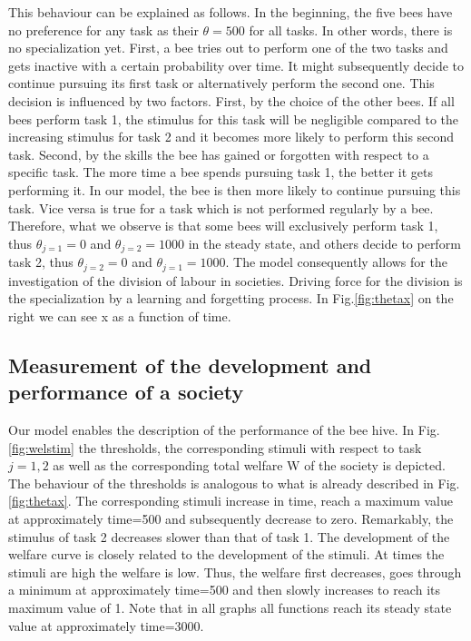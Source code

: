 This behaviour can be explained as follows. In the beginning, the five bees have no preference for any task as their $\theta=500$ for all tasks. In other words, there is no specialization yet. First, a bee tries out to perform one of the two tasks and gets inactive with a certain probability over time. It might subsequently decide to continue pursuing its first task or alternatively perform the second one. This decision is influenced by two factors. First, by the choice of the other bees. If all bees perform task 1, the stimulus for this task will be negligible compared to the increasing stimulus for task 2 and it becomes more likely to perform this second task. Second, by the skills the bee has gained or forgotten with respect to a specific task. The more time a bee spends pursuing task 1, the better it gets performing it. In our model, the bee is then more likely to continue pursuing this task. Vice versa is true for a task which is not performed regularly by a bee. Therefore, what we observe is that some bees will exclusively perform task 1, thus $\theta_{j=1}=0$ and $\theta_{j=2}=1000$ in the steady state, and others decide to perform task 2, thus $\theta_{j=2}=0$ and $\theta_{j=1}=1000$. The model consequently allows for the investigation of the division of labour in societies. Driving force for the division is the specialization by a learning and forgetting process.
In Fig.\ref{fig:thetax}  on the right we can see x as a function of time.

\subsection{Measurement of the development and performance of a society}
Our model enables the description of the performance of the bee hive. In Fig.\ref{fig:welstim} the thresholds, the corresponding stimuli with respect to task $j=1, 2$ as well as the corresponding total welfare W of the society is depicted. The behaviour of the thresholds is analogous to what is already described in Fig.\ref{fig:thetax}. The corresponding stimuli increase in time, reach a maximum value at approximately time=500 and subsequently decrease to zero. Remarkably, the stimulus of task 2 decreases slower than that of task 1. The development of the welfare curve is closely related to the development of the stimuli. At times the stimuli are high the welfare is low. Thus, the welfare first decreases, goes through a minimum at approximately time=500 and then slowly increases to reach its maximum value of 1. Note that in all graphs all functions reach its steady state value at approximately time=3000.

